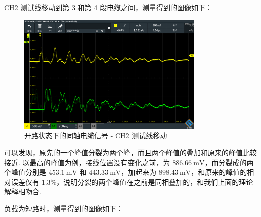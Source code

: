 \documentclass{customDoc}
\begin{document}
CH2 测试线移动到第 3 和第 4 段电缆之间，测量得到的图像如下：

\begin{figure}[H]
    \centering
    \includegraphics[width=0.8\textwidth]{SCR01.PNG}
    \caption{开路状态下的同轴电缆信号 - CH2 测试线移动}
    \label{fig:open_circuit_2}
\end{figure}

可以发现，原先的一个峰值分裂为两个峰，而且两个峰值的叠加和原来的峰值比较接近. 以最高的峰值为例，接线位置没有变化之前，为 $\SI{886.66}{\milli\volt}$，而分裂成的两个峰值分别是 $\SI{453.1}{\milli\volt}$ 和 $\SI{443.33}{\milli\volt}$，加起来为 $\SI{898.43}{\milli\volt}$，和原来的峰值的相对误差仅有 $1.3\%$，说明分裂的两个峰值在之前是同相叠加的，和我们上面的理论解释相吻合.

负载为短路时，测量得到的图像如下：
\end{document}
